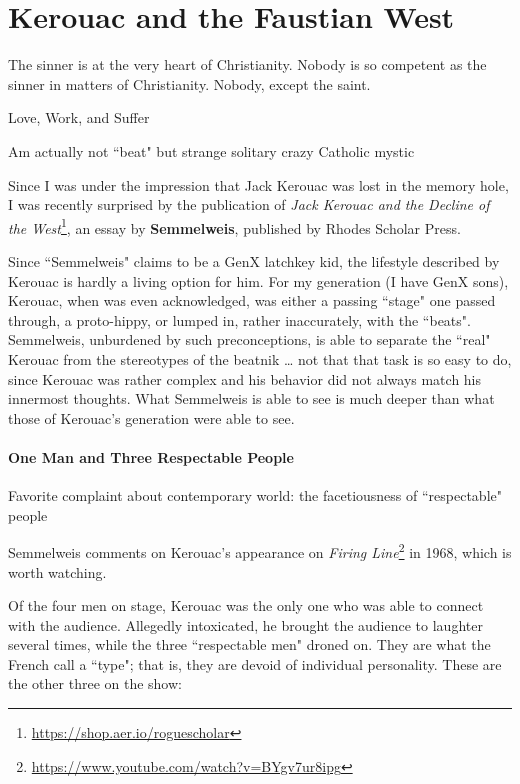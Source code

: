 \section{Kerouac and the Faustian West}

\begin{quotex}
The sinner is at the very heart of Christianity. Nobody is so competent as the sinner in matters of Christianity. Nobody, except the saint. 

Love, Work, and Suffer 

Am actually not ``beat" but strange solitary crazy Catholic mystic 

\end{quotex}
Since I was under the impression that Jack Kerouac was lost in the memory hole, I was recently surprised by the publication of \emph{Jack Kerouac and the Decline of the West}\footnote{\url{https://shop.aer.io/roguescholar}}, an essay by \textbf{Semmelweis}, published by Rhodes Scholar Press.

Since ``Semmelweis" claims to be a GenX latchkey kid, the lifestyle described by Kerouac is hardly a living option for him. For my generation (I have GenX sons), Kerouac, when was even acknowledged, was either a passing ``stage" one passed through, a proto-hippy, or lumped in, rather inaccurately, with the ``beats". Semmelweis, unburdened by such preconceptions, is able to separate the ``real" Kerouac from the stereotypes of the beatnik … not that that task is so easy to do, since Kerouac was rather complex and his behavior did not always match his innermost thoughts. What Semmelweis is able to see is much deeper than what those of Kerouac's generation were able to see.

\paragraph{One Man and Three Respectable People}
\begin{quotex}
Favorite complaint about contemporary world: the facetiousness of ``respectable" people 

\end{quotex}
Semmelweis comments on Kerouac's appearance on \emph{Firing Line}\footnote{\url{https://www.youtube.com/watch?v=BYgv7ur8ipg}} in 1968, which is worth watching.

Of the four men on stage, Kerouac was the only one who was able to connect with the audience. Allegedly intoxicated, he brought the audience to laughter several times, while the three ``respectable men" droned on. They are what the French call a ``type"; that is, they are devoid of individual personality. These are the other three on the show:

